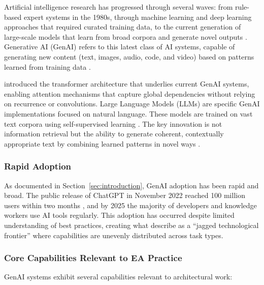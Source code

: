 Artificial intelligence research has progressed through several waves: from
rule-based expert systems in the 1980s, through machine learning and deep
learning approaches that required curated training data, to the current
generation of large-scale models that learn from broad corpora and generate
novel outputs \parencite{kanbach_genai_2024}. Generative AI (GenAI) refers to
this latest class of AI systems, capable of generating new content (text,
images, audio, code, and video) based on patterns learned from training data
\parencite{kanbach_genai_2024}.

\textcite{vaswani_attention_2017} introduced the transformer architecture that
underlies current GenAI systems, enabling attention mechanisms that capture
global dependencies without relying on recurrence or convolutions. Large
Language Models (LLMs) are specific GenAI implementations focused on natural
language. These models are trained on vast text corpora using self-supervised
learning \parencite{brown_language_2020}. The key innovation is not information
retrieval but the ability to generate coherent, contextually appropriate text by
combining learned patterns in novel ways \parencite{bubeck_sparks_2023}.

\subsubsection{Rapid Adoption}

As documented in Section~\ref{sec:introduction}, GenAI adoption has been rapid
and broad. The public release of ChatGPT in November 2022 reached 100 million
users within two months \parencite{hu_chatgpt_2023}, and by 2025 the majority
of developers and knowledge workers use AI tools regularly. This adoption has
occurred despite limited understanding of best practices, creating what
\textcite{dellacqua_navigating_2023} describe as a ``jagged technological
frontier'' where capabilities are unevenly distributed across task types.

\subsubsection{Core Capabilities Relevant to EA Practice}

GenAI systems exhibit several capabilities relevant to architectural work:

